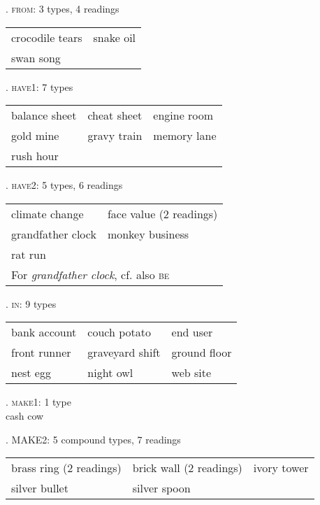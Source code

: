 \ex. \textsc{from}: 3 types, 4 readings\\
\begin{tabular}[h]{ll}
crocodile tears&snake oil\\         
swan song& 
\end{tabular}

\ex. \textsc{have1}: 7 types\\
\begin{tabular}[h]{lll}
balance sheet&cheat sheet&engine room\\       
gold mine&gravy train&memory lane\\       
rush hour&&         
\end{tabular}


\ex. \textsc{have2}: 5 types, 6 readings\\
\begin{tabular}[h]{ll}
climate change&face value (2 readings)\\        
grandfather clock&monkey business\\
rat run&\\
\multicolumn{2}{l}{For \emph{grandfather clock}, cf. also \textsc{be}}           
\end{tabular}

\ex. \textsc{in}: 9 types\\
\begin{tabular}[h]{lll}
bank account&couch potato&end user\\
front runner&graveyard shift&ground floor\\
nest egg&night owl&web site          
\end{tabular}

\ex. \textsc{make1}: 1 type
\\ cash cow          

\ex. MAKE2: 5 compound types, 7 readings\\
\begin{tabular}[h]{lll}
brass ring  (2 readings)&brick wall (2 readings)&ivory tower\\       
silver bullet&silver spoon&      
\end{tabular}



